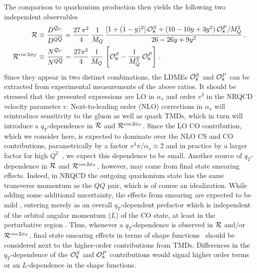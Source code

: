 \documentclass[prd,aps,preprintnumbers,nofootinbib,superscriptaddress]{revtex4}
\newcommand{\sT}{{\scriptscriptstyle T}}
\begin{document}
The comparison to quarkonium production then yields the following two independent observables
\begin{align}
{\cal R} & \equiv \frac{D^{{\cal Q}_{U}}}{D^{Q \overline Q}}= \frac{27\, \pi^2}{4}\,\frac{1}{M_Q} \, \frac{ [ 1+(1-y)^2 ] \, {\cal O}_{8}^S + ( 10-10y+3y^2  )\, {\cal O}_{8}^P /M_{Q}^{2}}{26 -26 y +9 y^2} \, , \\ 
{\cal R}^{\cos2\phi_\sT} & \equiv \frac{N^{{\cal Q}_{U}}}{N^{Q \overline Q}}= \frac{27 \pi^2}{4}\, \frac{1}{M_Q} \,  \left [{\cal O}_8^S - \frac{1}{M_Q^2} \, {\cal O}_8^P \right ] \,.
\label{eq:ratio-R}
\end{align}
Since they appear in two distinct combinations, the LDMEs ${\cal O}_8^S$ and ${\cal O}_8^P$ can be extracted from experimental measurements of the above ratios. It should be stressed that the presented expressions are LO  in $\alpha_s$ and order $v^3$ in the NRQCD velocity parameter $v$. Next-to-leading order (NLO) corrections in $\alpha_s$ will reintroduce sensitivity to the gluon as well as quark TMDs, which in turn will introduce a $q_\sT$-dependence in ${\cal R}$ and ${\cal R}^{\cos2\phi_\sT}$. Since the LO CO contribution, which we consider here, is expected to dominate over the NLO CS and CO contributions, parametrically by a factor $v^3 \pi/\alpha_s \approx 2$ and in practice by a larger factor for high $Q^2$~\cite{Fleming:1997fq}, we expect this dependence to be small. Another source of $q_\sT$-dependence in ${\cal R}$ and ${\cal R}^{\cos2\phi_\sT}$, however, may come from final state smearing effects. Indeed, in NRQCD the outgoing quarkonium state has the same transverse momentum as the $Q\overline{Q}$ pair, which is of course an idealization. While adding some additional uncertainty, the effects from smearing are expected to be mild \cite{Bacchetta:2018ivt}, entering merely as an overall $q_\sT$-dependent prefactor which is independent of the orbital angular momentum ($L$) of the CO  state, at least in the perturbative region \cite{Boer:2020bbd}. Thus, whenever a $q_\sT$-dependence is observed in ${\cal R}$ and/or ${\cal R}^{\cos2\phi_\sT}$, final state smearing effects in terms of shape functions~\cite{Echevarria:2019ynx,Fleming:2019pzj,Boer:2020bbd} should be considered next to the higher-order contributions from TMDs. Differences in the $q_\sT$-dependence of the ${\cal O}_8^S$ and ${\cal O}_8^P$ contributions would signal higher order terms or an $L$-dependence in the shape functions. 
\end{document}
